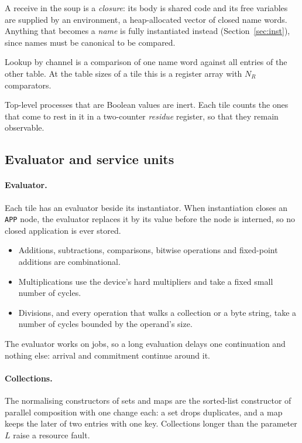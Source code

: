\documentclass[10.5pt,a4paper]{extarticle}
\newcommand{\kw}[1]{\texttt{#1}}
\theoremstyle{definition}
\theoremstyle{remark}
\begin{document}
A receive in the soup is a \emph{closure}: its body is shared code and its
free variables are supplied by an environment, a heap-allocated vector of
closed name words. Anything that becomes a \emph{name} is fully instantiated
instead (Section~\ref{sec:inst}), since names must be canonical to be
compared.

Lookup by channel is a comparison of one name word against all entries of the
other table. At the table sizes of a tile this is a register array with $N_R$
comparators.

Top-level processes that are Boolean values are inert. Each tile counts the
ones that come to rest in it in a two-counter \emph{residue} register, so
that they remain observable.

\subsection{Evaluator and service units}\label{sec:evaluator}

\paragraph{Evaluator.} Each tile has an evaluator beside its instantiator.
When instantiation closes an \kw{APP} node, the evaluator replaces it by its
value before the node is interned, so no closed application is ever stored.
\begin{itemize}
\item Additions, subtractions, comparisons, bitwise operations and
fixed-point additions are combinational.
\item Multiplications use the device's hard multipliers and take a fixed
small number of cycles.
\item Divisions, and every operation that walks a collection or a byte
string, take a number of cycles bounded by the operand's size.
\end{itemize}
The evaluator works on jobs, so a long evaluation delays one continuation
and nothing else: arrival and commitment continue around it.

\paragraph{Collections.} The normalising constructors of sets and maps are
the sorted-list constructor of parallel composition with one change each: a
set drops duplicates, and a map keeps the later of two entries with one key.
Collections longer than the parameter $L$ raise a resource fault.
\end{document}

